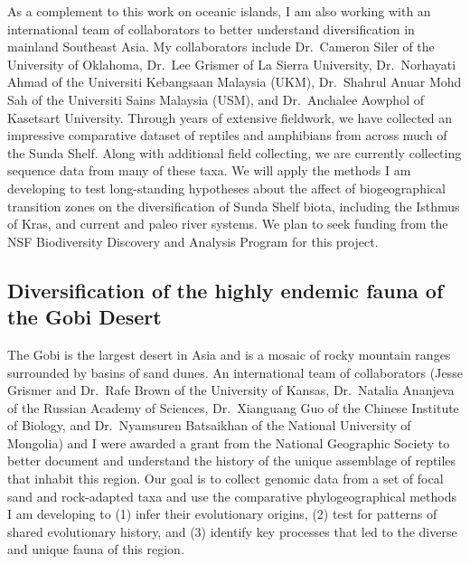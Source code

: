 As a complement to this work on oceanic islands, I am also working with an
international team of collaborators to better understand diversification in
mainland Southeast Asia.
My collaborators include
Dr.\ Cameron Siler of the University of Oklahoma,
Dr.\ Lee Grismer of La Sierra University,
Dr.\ Norhayati Ahmad of the Universiti
Kebangsaan Malaysia (UKM),
Dr.\ Shahrul Anuar Mohd Sah of the Universiti Sains Malaysia (USM),
and
Dr.\ Anchalee Aowphol of Kasetsart University.
Through years of extensive fieldwork, we have collected an impressive
comparative dataset of reptiles and amphibians from across much of the Sunda
Shelf.
Along with additional field collecting, we are currently collecting sequence
data from many of these taxa.
We will apply the methods I am developing to test long-standing hypotheses
about the affect of biogeographical transition zones on the diversification of
Sunda Shelf biota, including the Isthmus of Kras, and current and paleo river
systems.
We plan to seek funding from the NSF Biodiversity Discovery and Analysis
Program for this project.

\subsection*{Diversification of the highly endemic fauna of the Gobi Desert}
The Gobi is the largest desert in Asia and is a mosaic of rocky mountain ranges
surrounded by basins of sand dunes.
An international team of collaborators (Jesse Grismer and Dr.\ Rafe Brown of
the University of Kansas, Dr.\ Natalia Ananjeva of the Russian Academy of
Sciences, Dr.\ Xianguang Guo of the Chinese Institute of Biology, and Dr.\
Nyamsuren Batsaikhan of the National University of Mongolia) and I were awarded
a grant from the National Geographic Society to better document and understand
the history of the unique assemblage of reptiles that inhabit this region.
Our goal is to collect genomic data from a set of focal sand and rock-adapted
taxa and use the comparative phylogeographical methods I am developing to
(1) infer their evolutionary origins,
(2) test for patterns of shared evolutionary history, and
(3) identify key processes that led to the diverse and unique fauna of this
region.

